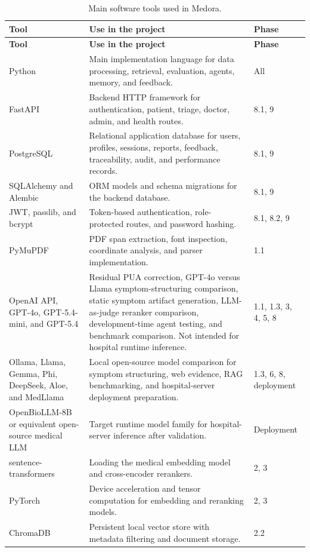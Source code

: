\begin{longtable}{p{} p{} p{}}
\caption{Main software tools used in Medora.}
\label{tab:software_tools}\\
\toprule
\textbf{Tool} & \textbf{Use in the project} & \textbf{Phase}\\
\midrule
\endfirsthead
\toprule
\textbf{Tool} & \textbf{Use in the project} & \textbf{Phase}\\
\midrule
\endhead
Python & Main implementation language for data processing, retrieval, evaluation, agents, memory, and feedback. & All\\
FastAPI & Backend HTTP framework for authentication, patient, triage, doctor, admin, and health routes. & 8.1, 9\\
PostgreSQL & Relational application database for users, profiles, sessions, reports, feedback, traceability, audit, and performance records. & 8.1, 9\\
SQLAlchemy and Alembic & ORM models and schema migrations for the backend database. & 8.1, 9\\
JWT, passlib, and bcrypt & Token-based authentication, role-protected routes, and password hashing. & 8.1, 8.2, 9\\
PyMuPDF & PDF span extraction, font inspection, coordinate analysis, and parser implementation. & 1.1\\
OpenAI API, GPT-4o, GPT-5.4-mini, and GPT-5.4 & Residual PUA correction, GPT-4o versus Llama symptom-structuring comparison, static symptom artifact generation, LLM-as-judge reranker comparison, development-time agent testing, and benchmark comparison. Not intended for hospital runtime inference. & 1.1, 1.3, 3, 4, 5, 8\\
Ollama, Llama, Gemma, Phi, DeepSeek, Aloe, and MedLlama & Local open-source model comparison for symptom structuring, web evidence, RAG benchmarking, and hospital-server deployment preparation. & 1.3, 6, 8, deployment\\
OpenBioLLM-8B or equivalent open-source medical LLM & Target runtime model family for hospital-server inference after validation. & Deployment\\
sentence-transformers & Loading the medical embedding model and cross-encoder rerankers. & 2, 3\\
PyTorch & Device acceleration and tensor computation for embedding and reranking models. & 2, 3\\
ChromaDB & Persistent local vector store with metadata filtering and document storage. & 2.2\\

\end{longtable}
